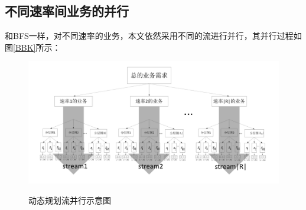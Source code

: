 \subsection{不同速率间业务的并行}
和BFS一样，对不同速率的业务，本文依然采用不同的流进行并行，其并行过程如图\ref{BBK}所示：
\begin{figure}
\setlength{\belowcaptionskip}{-0.5cm}
\begin{center}
{\includegraphics[width=1 \textwidth]{figures/BBK.pdf}}
\end{center}
\caption{{\footnotesize{动态规划流并行示意图}}}
\label{prof}
\end{figure}
